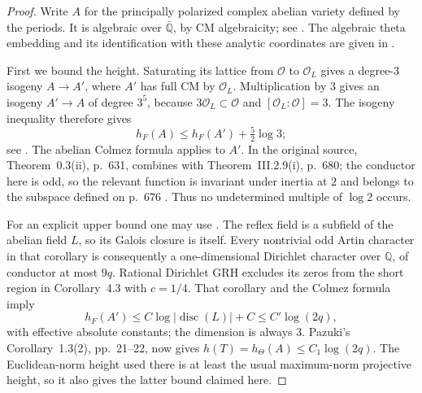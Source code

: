 \documentclass[11pt]{article}
\theoremstyle{definition}
\theoremstyle{remark}
\begin{document}
\begin{proof}
Write \(A\) for the principally polarized complex abelian variety
defined by the periods. It is algebraic over \(\overline{\mathbb Q}\),
by CM algebraicity; see \citet[Proposition~7.9, p.~54]{MilneCM2020}.
The algebraic theta embedding and its identification with these
analytic coordinates are given in
\citet[Sections~2.3.1--2.3.4, pp.~27--31]{Pazuki2012}.

First we bound the height. Saturating its lattice from \(\mathcal O\)
to \(\mathcal O_L\) gives a degree-\(3\) isogeny \(A\to A'\), where
\(A'\) has full CM by \(\mathcal O_L\). Multiplication by \(3\) gives
an isogeny \(A'\to A\) of degree \(3^5\), because
\(3\mathcal O_L\subset\mathcal O\) and
\([\mathcal O_L:\mathcal O]=3\). The isogeny inequality therefore gives
\[
 h_F(A)\leq h_F(A')+\tfrac52\log3;
\]
see \citet[Remark~2.3, p.~27]{Pazuki2012}.
The abelian Colmez formula applies to \(A'\). In the original source,
Theorem~0.3(ii), p.~631, combines with Theorem~III.2.9(i), p.~680;
the conductor here is odd, so the relevant function is invariant under
inertia at \(2\) and belongs to the subspace defined on p.~676
\citep{Colmez1993}. Thus no undetermined multiple of \(\log2\) occurs.

For an explicit upper bound one may use
\citet[Corollary~4.3, author/PDF pp.~14--15;
Theorem~4.8, p.~18]{Wei2021}. The reflex field is a subfield of
the abelian field \(L\), so its Galois closure is itself. Every
nontrivial odd Artin character in that corollary is consequently
a one-dimensional Dirichlet character over \(\mathbb Q\), of conductor at most
\(9q\). Rational Dirichlet GRH excludes its zeros from the short
region in Corollary~4.3 with \(c=1/4\). That corollary and the Colmez
formula imply
\[
 h_F(A')\leq C\log|\operatorname{disc}(L)|+C
           \leq C'\log(2q),
\]
with effective absolute constants; the dimension is always \(3\).
Pazuki's Corollary~1.3(2), pp.~21--22, now gives
\(h(T)=h_\Theta(A)\leq C_1\log(2q)\).
The Euclidean-norm height used there is at least the usual maximum-norm
projective height, so it also gives the latter bound claimed here.


\end{proof}
\end{document}
